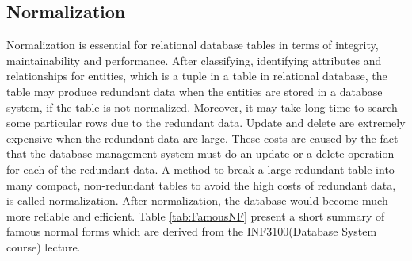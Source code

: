 \subsection{Normalization}
Normalization is essential for relational database tables in terms of integrity, maintainability and performance. After classifying, identifying attributes and relationships for entities, which is a tuple in a table in relational database, the table may produce redundant data when the entities are stored in a database system, if the table is not normalized. Moreover, it may take long time to search some particular rows due to the redundant data. Update and delete are extremely expensive when the redundant data are large. These costs are caused by the fact that the database management system must do an update or a delete operation for each of the redundant data. A method to break a large redundant table into many compact, non-redundant tables to avoid the high costs of redundant data, is called normalization. After normalization, the database would become much more reliable and efficient. Table \ref{tab:FamousNF} present a short summary of famous normal forms which are derived from the INF3100(Database System course)\citep{INF3100} lecture.
